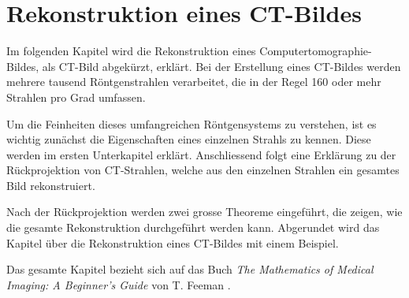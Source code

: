 %
%
%
%
\chapter{Rekonstruktion eines CT-Bildes \label{chapter:ct}}
\begin{refsection}

Im folgenden Kapitel wird die Rekonstruktion eines Computertomographie-Bildes, als CT-Bild abgekürzt, erklärt. 
%
Bei der Erstellung eines CT-Bildes werden mehrere tausend Röntgenstrahlen verarbeitet, die in der Regel 160 oder mehr Strahlen pro Grad umfassen. 
%

Um die Feinheiten dieses umfangreichen Röntgensystems zu verstehen, ist es wichtig zunächst die Eigenschaften eines einzelnen Strahls zu kennen. Diese werden im ersten Unterkapitel erklärt. 
Anschliessend folgt eine Erklärung zu der Rückprojektion von CT-Strahlen, welche aus den einzelnen Strahlen ein gesamtes Bild rekonstruiert. 

Nach der Rückprojektion werden zwei grosse Theoreme eingeführt, die zeigen, wie die gesamte Rekonstruktion durchgeführt werden kann. Abgerundet wird das Kapitel über die Rekonstruktion eines CT-Bildes mit einem Beispiel.

Das gesamte Kapitel bezieht sich auf das Buch \emph{The Mathematics of Medical Imaging: A Beginner's Guide} von T. Feeman \cite{feeman_mathematics_2015}.






\printbibliography[heading=subbibliography]
\end{refsection}
